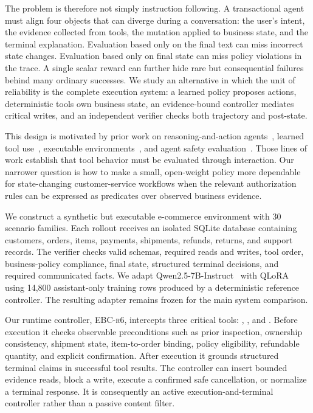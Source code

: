\documentclass[11pt]{article}
\newcommand{\controller}{\textsc{EBC-r6}}
\begin{document}
The problem is therefore not simply instruction following. A transactional agent must align four objects that can diverge during a conversation: the user's intent, the evidence collected from tools, the mutation applied to business state, and the terminal explanation. Evaluation based only on the final text can miss incorrect state changes. Evaluation based only on final state can miss policy violations in the trace. A single scalar reward can further hide rare but consequential failures behind many ordinary successes. We study an alternative in which the unit of reliability is the complete execution system: a learned policy proposes actions, deterministic tools own business state, an evidence-bound controller mediates critical writes, and an independent verifier checks both trajectory and post-state.

This design is motivated by prior work on reasoning-and-action agents~\citep{yao2023react}, learned tool use~\citep{schick2023toolformer,yang2023gpt4tools}, executable environments~\citep{yao2022webshop,yao2025taubench,lu2025toolsandbox}, and agent safety evaluation~\citep{ruan2024toolemu,debenedetti2024agentdojo,ye2024toolsword}. Those lines of work establish that tool behavior must be evaluated through interaction. Our narrower question is how to make a small, open-weight policy more dependable for state-changing customer-service workflows when the relevant authorization rules can be expressed as predicates over observed business evidence.

We construct a synthetic but executable e-commerce environment with 30 scenario families. Each rollout receives an isolated SQLite database containing customers, orders, items, payments, shipments, refunds, returns, and support records. The verifier checks valid schemas, required reads and writes, tool order, business-policy compliance, final state, structured terminal decisions, and required communicated facts. We adapt Qwen2.5-7B-Instruct~\citep{qwen2024qwen25} with QLoRA~\citep{hu2022lora,dettmers2023qlora} using 14,800 assistant-only training rows produced by a deterministic reference controller. The resulting adapter remains frozen for the main system comparison.

Our runtime controller, \controller, intercepts three critical tools: , , and . Before execution it checks observable preconditions such as prior inspection, ownership consistency, shipment state, item-to-order binding, policy eligibility, refundable quantity, and explicit confirmation. After execution it grounds structured terminal claims in successful tool results. The controller can insert bounded evidence reads, block a write, execute a confirmed safe cancellation, or normalize a terminal response. It is consequently an active execution-and-terminal controller rather than a passive content filter.
\end{document}
